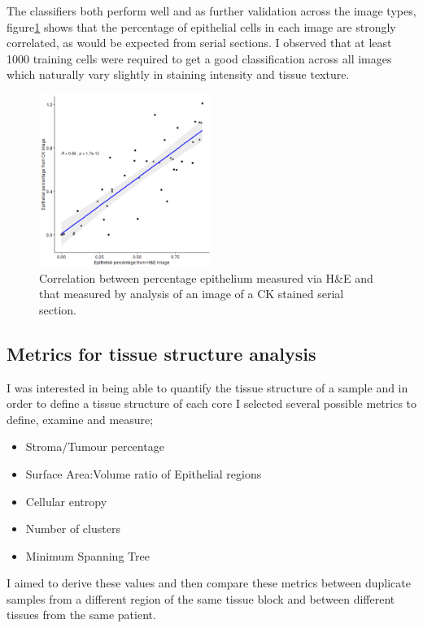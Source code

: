 The classifiers both perform well and as further validation across the image types, figure\ref{fig:correlation_tumourarea} shows that the percentage of epithelial cells in each image are strongly correlated, as would be expected from serial sections. I observed that at least 1000 training cells were required to get a good classification across all images which naturally vary slightly in staining intensity and tissue texture.

\begin{figure}
    \centering
    \includegraphics[width=0.5\textwidth]{Chapter3/Figs/correlation_TS_he_Ck.png}
    \caption{Correlation between percentage epithelium measured via H\&E and that measured by analysis of an image of a CK stained serial section.}
    \label{fig:correlation_tumourarea}
\end{figure}


\subsection{Metrics for tissue structure analysis}

I was interested in being able to quantify the tissue structure of a sample and in order to define a tissue structure of each core I selected several possible metrics to define, examine and measure;

\begin{itemize}
    \item Stroma/Tumour percentage
    \item Surface Area:Volume ratio of Epithelial regions
    \item Cellular entropy
    \item Number of clusters
    \item Minimum Spanning Tree
\end{itemize}

I aimed to derive these values and then compare these metrics between duplicate samples from a different region of the same tissue block and between different tissues from the same patient.

